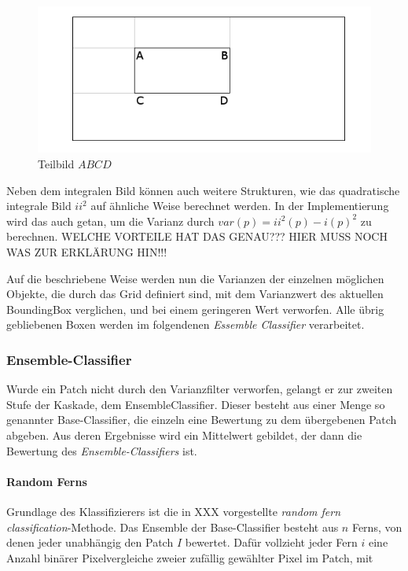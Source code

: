 \begin{figure}
\centering{}\includegraphics[scale=0.7]{../pictures/IntegralImage.png}\caption{Teilbild $ABCD$}
\label{Subwindow}
\end{figure}

Neben dem integralen Bild können auch weitere Strukturen, wie das quadratische integrale Bild $ii^{2}$ auf ähnliche Weise berechnet werden. In der Implementierung wird das auch getan, um die Varianz durch $var(p)=ii^{2}(p)-i(p)^{2}$ zu berechnen. WELCHE VORTEILE HAT DAS GENAU??? HIER MUSS NOCH WAS ZUR ERKLÄRUNG HIN!!! 

Auf die beschriebene Weise werden nun die Varianzen der einzelnen möglichen Objekte, die durch das Grid definiert sind, mit dem Varianzwert des aktuellen BoundingBox verglichen, und bei einem geringeren Wert verworfen. Alle übrig gebliebenen Boxen werden im folgendenen \textit{Essemble Classifier} verarbeitet.

\subsubsection{Ensemble-Classifier}
Wurde ein Patch nicht durch den Varianzfilter verworfen, gelangt er zur zweiten Stufe der Kaskade, dem EnsembleClassifier. Dieser besteht aus einer Menge so genannter Base-Classifier, die einzeln eine Bewertung zu dem übergebenen Patch abgeben. Aus deren Ergebnisse wird ein Mittelwert gebildet, der dann die Bewertung des \textit{Ensemble-Classifiers} ist.

\paragraph{Random Ferns}
Grundlage des Klassifizierers ist die in XXX vorgestellte \textit{random fern classification}-Methode. Das Ensemble der Base-Classifier besteht aus $n$ Ferns, von denen jeder unabhängig den Patch $I$ bewertet. Dafür vollzieht jeder Fern $i$ eine Anzahl binärer Pixelvergleiche zweier zufällig gewählter Pixel im Patch, mit

